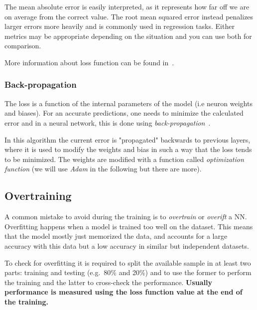The mean absolute error is easily interpreted, as it represents how far off we are on average from the correct value. The root mean squared error instead penalizes larger errors more heavily and is commonly used in regression tasks. Either metrics may be appropriate depending on the situation and you can use both for comparison. 

More information about loss function can be found in~\cite{bib:loss_function}.

\subsubsection{Back-propagation}
The loss is a function of the internal parameters of the model (i.e neuron weights and biases). For an accurate predictions, one needs to minimize the calculated error and in a neural network, this is done using
\emph{back-propagation}~\cite{bib:backpropagation}.

In this algorithm the current error is "propagated" backwards to previous layers, where it is used to modify the weights and bias in such a way that the loss tends to be minimized.
The weights are modified with a function called \emph{optimization function} (we will use \emph{Adam} in the following but there are more).


\subsection{Overtraining}
A common mistake to avoid during the training is to \emph{overtrain} or \emph{overift} a NN. %
Overfitting happens when a model is trained too well on the dataset. This means that the model mostly just memorized the data, and accounts for a large accuracy with this data but a low accuracy in similar but independent datasets. 

To check for overfitting it is required to split the available sample in at least two parts: training and testing (e.g.~80\% and 20\%) and to use the former to perform the training and the latter to cross-check the performance.
\textbf{Usually performance is measured using the loss function value at the end of the training.}

